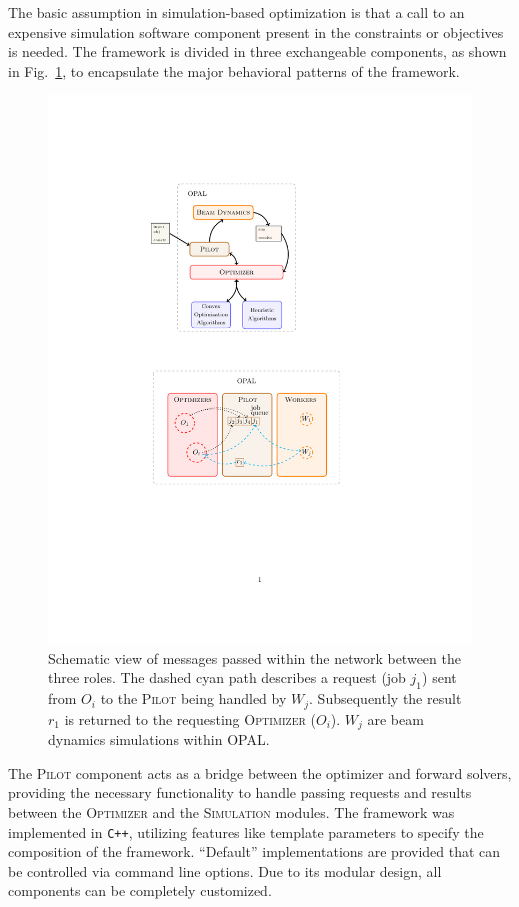 \documentclass[preprint,linenumbers,amsmath,amssymb,aps,prstab]{revtex4-1}%
\begin{document}
The basic assumption in simulation-based optimization is that a
  call to an expensive simulation software component present in the
  constraints or objectives is needed.
The framework is divided in three exchangeable components, as shown in
  Fig.~\ref{fig:opt-framework-layout}, to encapsulate the major behavioral
  patterns of the framework.
%
\begin{figure}
  \centering
  \includegraphics[width=0.7\linewidth]{opt-framework-layout}
  \caption{Schematic view of messages passed within the network between the
    three roles.
  The dashed cyan path describes a request (job $j_1$) sent from $O_i$ to the
  \textsc{Pilot} being handled by $W_j$. Subsequently the result $r_1$ is
  returned to the requesting \textsc{Optimizer} ($O_i$). $W_j$ are beam dynamics 
  simulations within OPAL.}
  \label{fig:opt-framework-layout}
\end{figure}
%
The \textsc{Pilot} component acts as a bridge between the optimizer and
  forward solvers, providing the necessary functionality to handle passing
  requests and results between the \textsc{Optimizer} and the
  \textsc{Simulation} modules.
The framework was implemented in \texttt{C++}, utilizing features like template
parameters to specify the composition of the framework.
``Default'' implementations are provided that can be controlled via command line options.
Due to its modular design, all components can be completely customized.
\end{document}
